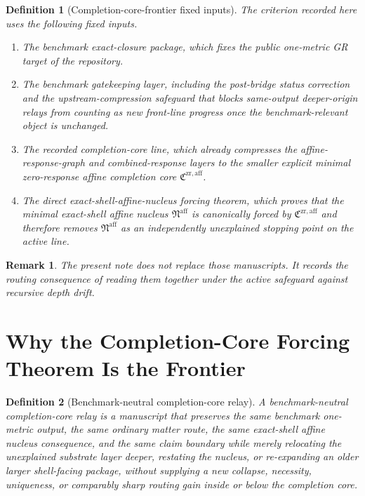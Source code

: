 \documentclass[11pt]{article}
\newcommand{\CompletionCore}{\mathfrak C^{\mathrm{zr,aff}}}
\newcommand{\AffineNucleus}{\mathfrak N^{\mathrm{aff}}}
\newtheorem{definition}{Definition}
\newtheorem{remark}{Remark}
\begin{document}
\begin{definition}[Completion-core-frontier fixed inputs]
The criterion recorded here uses the following fixed inputs.
\begin{enumerate}
    \item The benchmark exact-closure package, which fixes the public one-metric GR target of the repository.
    \item The benchmark gatekeeping layer, including the post-bridge status correction and the upstream-compression safeguard that blocks same-output deeper-origin relays from counting as new front-line progress once the benchmark-relevant object is unchanged.
    \item The recorded completion-core line, which already compresses the affine-response-graph and combined-response layers to the smaller explicit minimal zero-response affine completion core \(\CompletionCore\).
    \item The direct exact-shell-affine-nucleus forcing theorem, which proves that the minimal exact-shell affine nucleus \(\AffineNucleus\) is canonically forced by \(\CompletionCore\) and therefore removes \(\AffineNucleus\) as an independently unexplained stopping point on the active line.
\end{enumerate}
\end{definition}

\begin{remark}
The present note does not replace those manuscripts. It records the routing consequence of reading them together under the active safeguard against recursive depth drift.
\end{remark}

\section{Why the Completion-Core Forcing Theorem Is the Frontier}

\begin{definition}[Benchmark-neutral completion-core relay]
A \emph{benchmark-neutral completion-core relay} is a manuscript that preserves the same benchmark one-metric output, the same ordinary matter route, the same exact-shell affine nucleus consequence, and the same claim boundary while merely relocating the unexplained substrate layer deeper, restating the nucleus, or re-expanding an older larger shell-facing package, without supplying a new collapse, necessity, uniqueness, or comparably sharp routing gain inside or below the completion core.
\end{definition}
\end{document}
